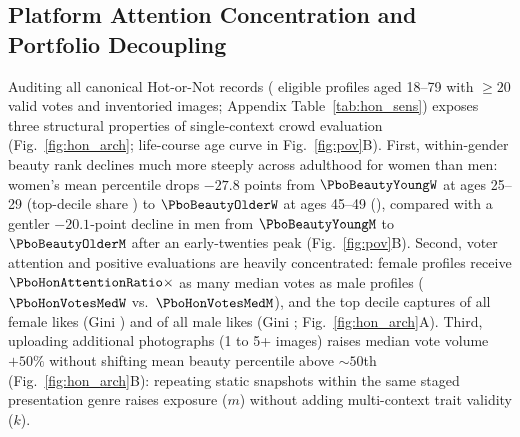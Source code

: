 \subsection{Platform Attention Concentration and Portfolio Decoupling}
Auditing all \PboHonRows{} canonical Hot-or-Not records (\PboHonEligible{} eligible profiles aged 18--79 with $\ge 20$ valid votes and \PboHonFiles{} inventoried images; Appendix Table~\ref{tab:hon_sens}) exposes three structural properties of single-context crowd evaluation (Fig.~\ref{fig:hon_arch}; life-course age curve in Fig.~\ref{fig:pov}B). First, within-gender beauty rank declines much more steeply across adulthood for women than men: women's mean percentile drops $-27.8$ points from $\PboBeautyYoungW$ at ages 25--29 (top-decile share \PboBeautyTopYoungW) to $\PboBeautyOlderW$ at ages 45--49 (\PboBeautyTopOlderW), compared with a gentler $-20.1$-point decline in men from $\PboBeautyYoungM$ to $\PboBeautyOlderM$ after an early-twenties peak (Fig.~\ref{fig:pov}B). Second, voter attention and positive evaluations are heavily concentrated: female profiles receive $\PboHonAttentionRatio\times$ as many median votes as male profiles ($\PboHonVotesMedW$ vs.\ $\PboHonVotesMedM$), and the top decile captures \PboHonTopDecileLikesW{} of all female likes (Gini \PboHonLikesGiniW) and \PboHonTopDecileLikesM{} of all male likes (Gini \PboHonLikesGiniM; Fig.~\ref{fig:hon_arch}A). Third, uploading additional photographs (1 to 5+ images) raises median vote volume $+50\%$ without shifting mean beauty percentile above $\sim\!50$th (Fig.~\ref{fig:hon_arch}B): repeating static snapshots within the same staged presentation genre raises exposure ($m$) without adding multi-context trait validity ($k$).

